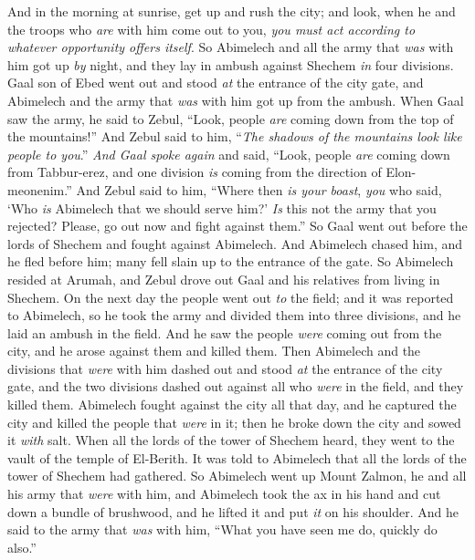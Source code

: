 \begin{biblechapter}
\verse And in the morning at sunrise, get up and rush the city; and look, when he and the troops who \textit{are} with him come out to you, \textit{you must act according to whatever opportunity offers itself}.
\verse So Abimelech and all the army that \textit{was} with him got up \textit{by} night, and they lay in ambush against Shechem \textit{in} four divisions.
\verse Gaal son of Ebed went out and stood \textit{at} the entrance of the city gate, and Abimelech and the army that \textit{was} with him got up from the ambush.
\verse When Gaal saw the army, he said to Zebul, “Look, people \textit{are} coming down from the top of the mountains!” And Zebul said to him, “\textit{The shadows of the mountains look like people to you}.”
\verse \textit{And Gaal spoke again} and said, “Look, people \textit{are} coming down from Tabbur-erez, and one division \textit{is} coming from the direction of Elon-meonenim.”
\verse And Zebul said to him, “Where then \textit{is your boast}, \textit{you} who said, ‘Who \textit{is} Abimelech that we should serve him?’ \textit{Is} this not the army that you rejected? Please, go out now and fight against them.”
\verse So Gaal went out before the lords of Shechem and fought against Abimelech.
\verse And Abimelech chased him, and he fled before him; many fell slain up to the entrance of the gate.
\verse So Abimelech resided at Arumah, and Zebul drove out Gaal and his relatives from living in Shechem.
\verse On the next day the people went out \textit{to} the field; and it was reported to Abimelech,
\verse so he took the army and divided them into three divisions, and he laid an ambush in the field. And he saw the people \textit{were} coming out from the city, and he arose against them and killed them.
\verse Then Abimelech and the divisions that \textit{were} with him dashed out and stood \textit{at} the entrance of the city gate, and the two divisions dashed out against all who \textit{were} in the field, and they killed them.
\verse Abimelech fought against the city all that day, and he captured the city and killed the people that \textit{were} in it; then he broke down the city and sowed it \textit{with} salt.
\verse When all the lords of the tower of Shechem heard, they went to the vault of the temple of El-Berith.
\verse It was told to Abimelech that all the lords of the tower of Shechem had gathered.
\verse So Abimelech went up Mount Zalmon, he and all his army that \textit{were} with him, and Abimelech took the ax in his hand and cut down a bundle of brushwood, and he lifted it and put \textit{it} on his shoulder. And he said to the army that \textit{was} with him, “What you have seen me do, quickly do also.”

\end{biblechapter}
